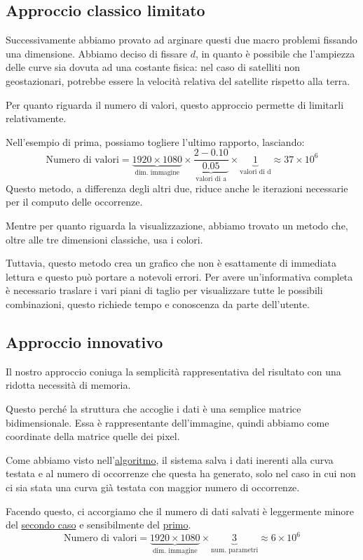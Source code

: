 \subsection{Approccio classico limitato}\label{conclusioni_caso2}
Successivamente abbiamo provato ad arginare questi due macro problemi fissando una dimensione. Abbiamo deciso di fissare $d$, in quanto è possibile che l'ampiezza delle curve sia dovuta ad una costante fisica: nel caso di satelliti non geostazionari, potrebbe essere la velocità relativa del satellite rispetto alla terra.\par
Per quanto riguarda il numero di valori, questo approccio permette di limitarli relativamente.\par
Nell'esempio di prima, possiamo togliere l'ultimo rapporto, lasciando:
$$\text{Numero di valori} = \underbrace{1920\times 1080}_{\text{dim. immagine}}\times\underbrace{\frac{2-0.10}{0.05}}_{\text{valori di a}}\times \underbrace{1}_{\text{valori di d}}\approx 37\times10^6$$
Questo metodo, a differenza degli altri due, riduce anche le iterazioni necessarie per il computo delle occorrenze.\par
Mentre per quanto riguarda la visualizzazione, abbiamo trovato un metodo che, oltre alle tre dimensioni classiche, usa i colori.\par
Tuttavia, questo metodo crea un grafico che non è esattamente di immediata lettura e questo può portare a notevoli errori. Per avere un'informativa completa è necessario traslare i vari piani di taglio per visualizzare tutte le possibili combinazioni, questo richiede tempo e conoscenza da parte dell'utente.\par

\subsection{Approccio innovativo}
Il nostro approccio coniuga la semplicità rappresentativa del risultato con una ridotta necessità di memoria.\par
Questo perché la struttura che accoglie i dati è una semplice matrice bidimensionale. Essa è rappresentante dell'immagine, quindi abbiamo come coordinate della matrice quelle dei pixel.\par
Come abbiamo visto nell'\hyperref[lst:ostinelli]{algoritmo}, il sistema salva i dati inerenti alla curva testata e al numero di occorrenze che questa ha generato, solo nel caso in cui non ci sia stata una curva già testata con maggior numero di occorrenze.\par
Facendo questo, ci accorgiamo che il numero di dati salvati è leggermente minore del \hyperref[conclusioni_caso2]{secondo caso} e sensibilmente del \hyperref[conclusioni_caso1]{primo}.
$$\text{Numero di valori} = \underbrace{1920\times 1080}_{\text{dim. immagine}}\times\underbrace{3}_{\text{num. parametri}}\approx 6\times10^6$$

